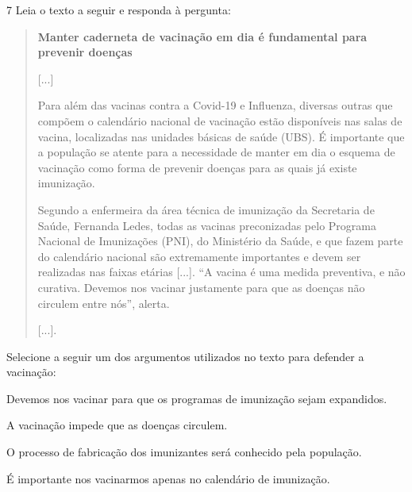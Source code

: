 \num{7} Leia o texto a seguir e responda à pergunta:

\begin{quote}
\textbf{Manter caderneta de vacinação em dia é fundamental para prevenir
doenças}

{[}...{]}

Para além das vacinas contra a Covid-19 e Influenza, diversas outras que
compõem o calendário nacional de vacinação estão disponíveis nas salas
de vacina, localizadas nas unidades básicas de saúde (UBS). É importante
que a população se atente para a necessidade de manter em dia o esquema
de vacinação como forma de prevenir doenças para as quais já existe
imunização.

Segundo a enfermeira da área técnica de imunização da Secretaria de
Saúde, Fernanda Ledes, todas as vacinas preconizadas pelo Programa
Nacional de Imunizações (PNI), do Ministério da Saúde, e que fazem parte
do calendário nacional são extremamente importantes e devem ser
realizadas nas faixas etárias {[}...{]}. ``A vacina é uma medida
preventiva, e não curativa. Devemos nos vacinar justamente para que as
doenças não circulem entre nós'', alerta.

{[}...{]}.

\end{quote}

Selecione a seguir um dos argumentos utilizados no texto para defender a
vacinação:

\begin{escolha}
\item Devemos nos vacinar para que os programas de imunização sejam expandidos.

\item A vacinação impede que as doenças circulem.

\item O processo de fabricação dos imunizantes será conhecido pela população.

\item É importante nos vacinarmos apenas no calendário de imunização.
\end{escolha}


